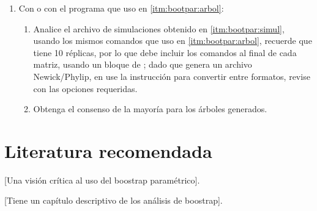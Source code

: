 \begin{enumerate}
  \item Con  o con el programa que uso en \ref{itm:bootpar:arbol}:
  \begin{enumerate}
    \item Analice el archivo de simulaciones obtenido en \ref{itm:bootpar:simul}, usando los mismos comandos que uso en \ref{itm:bootpar:arbol}, recuerde que tiene 10 r\'eplicas, por lo que debe incluir los comandos al final de cada matriz, usando un bloque de ; dado que  genera un archivo Newick/Phylip, en  use la instrucci\'on  para convertir entre formatos, revise con  las opciones requeridas. 
    \item Obtenga el consenso de la mayor\'ia para los \'arboles generados.
  \end{enumerate}
  
\end{enumerate}
  



\section*{Literatura recomendada}

\cite{Antezana2003} [Una visi\'on cr\'itica al uso del boostrap param\'etrico].

\cite{Felsenstein2004}[Tiene un cap\'itulo descriptivo de los an\'alisis de boostrap].
